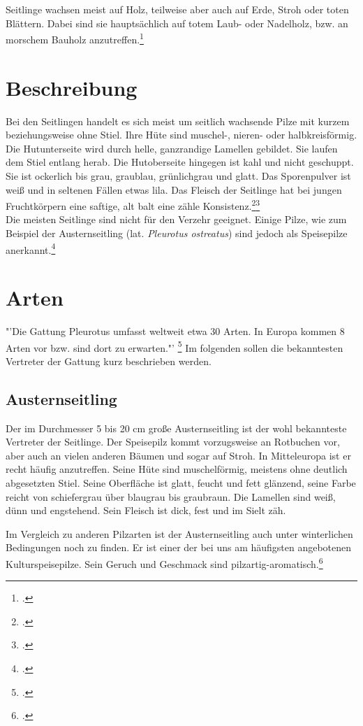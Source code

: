 \documentclass[a4paper,abstracton]{scrreprt}
\begin{document}
Seitlinge wachsen meist auf Holz, teilweise aber auch auf Erde, Stroh oder toten Blättern. Dabei sind sie hauptsächlich auf totem Laub- oder Nadelholz, bzw. an morschem Bauholz anzutreffen.\footcite{pilzech}

\section{Beschreibung}
Bei den Seitlingen handelt es sich meist um seitlich wachsende Pilze mit kurzem beziehungsweise ohne Stiel. Ihre Hüte sind muschel-, nieren- oder halbkreisförmig. Die Hutunterseite wird durch helle, ganzrandige Lamellen gebildet. Sie laufen dem Stiel entlang herab. Die Hutoberseite hingegen ist kahl und nicht geschuppt. Sie ist ockerlich bis grau, graublau, grünlichgrau und glatt. Das Sporenpulver ist weiß und in seltenen Fällen etwas lila. Das Fleisch der Seitlinge hat bei jungen Fruchtkörpern eine saftige, alt balt eine zähle Konsistenz.\footcite{faktenuber}\footcite{pilzech}\\
Die meisten Seitlinge sind nicht für den Verzehr geeignet. Einige Pilze, wie zum Beispiel der Austernseitling (lat. \emph{Pleurotus ostreatus}) sind jedoch als Speisepilze anerkannt.\footcite{pg_austernseitling}

\section{Arten}
"'Die Gattung Pleurotus umfasst weltweit etwa 30 Arten. In Europa kommen 8 Arten vor bzw. sind dort zu erwarten."' \footcite{faktenuber} Im folgenden sollen die bekanntesten Vertreter der Gattung kurz beschrieben werden.

\subsection{Austernseitling}
Der im Durchmesser 5 bis 20 cm große Austernseitling ist der wohl bekannteste Vertreter der Seitlinge. Der Speisepilz kommt vorzugsweise an Rotbuchen vor, aber auch an vielen anderen Bäumen und sogar auf Stroh. In Mitteleuropa ist er recht häufig anzutreffen. Seine Hüte sind muschelförmig, meistens ohne deutlich abgesetzten Stiel. Seine Oberfläche ist glatt, feucht und fett glänzend, seine Farbe reicht von schiefergrau über blaugrau bis graubraun. Die Lamellen sind weiß, dünn und engstehend. Sein Fleisch ist dick, fest und im Sielt zäh.

Im Vergleich zu anderen Pilzarten ist der Austernseitling auch unter winterlichen Bedingungen noch zu finden. Er ist einer der bei uns am häufigsten angebotenen Kulturspeisepilze. Sein Geruch und Geschmack sind pilzartig-aromatisch.\footcite{tintling_auster}
\end{document}
